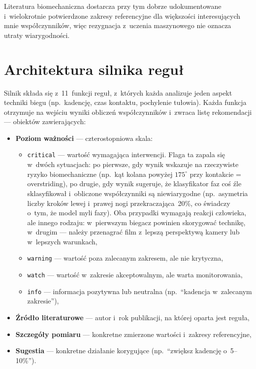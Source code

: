 Literatura biomechaniczna dostarcza przy tym dobrze udokumentowane i~wielokrotnie potwierdzone zakresy referencyjne dla większości interesujących mnie współczynników, więc rezygnacja z~uczenia maszynowego nie oznacza utraty wiarygodności.

\section{Architektura silnika reguł}
\label{sec:rules-arch}

Silnik składa się z~11~funkcji reguł, z~których każda analizuje jeden aspekt techniki biegu (np.~kadencję, czas kontaktu, pochylenie tułowia). Każda funkcja otrzymuje na wejściu wyniki obliczeń współczynników i~zwraca listę rekomendacji --- obiektów zawierających:

\begin{itemize}
    \item \textbf{Poziom ważności} --- czterostopniowa skala:
    \begin{itemize}
        \item \texttt{critical} --- wartość wymagająca interwencji. Flaga ta zapala się w~dwóch sytuacjach: po pierwsze, gdy wynik wskazuje na rzeczywiste ryzyko biomechaniczne (np.~kąt kolana powyżej $175^\circ$ przy kontakcie = overstriding), po drugie, gdy wynik sugeruje, że klasyfikator faz coś źle sklasyfikował i~obliczone współczynniki są niewiarygodne (np.~asymetria liczby kroków lewej i~prawej nogi przekraczająca~20\%, co świadczy o~tym, że model myli fazy). Oba przypadki wymagają reakcji człowieka, ale innego rodzaju: w~pierwszym biegacz powinien skorygować technikę, w~drugim --- należy przenagrać film z~lepszą perspektywą kamery lub w~lepszych warunkach,
        \item \texttt{warning} --- wartość poza zalecanym zakresem, ale nie krytyczna,
        \item \texttt{watch} --- wartość w~zakresie akceptowalnym, ale warta monitorowania,
        \item \texttt{info} --- informacja pozytywna lub neutralna (np.~``kadencja w~zalecanym zakresie''),
    \end{itemize}
    \item \textbf{Źródło literaturowe}  --- autor i~rok publikacji, na której oparta jest reguła,
    \item \textbf{Szczegóły pomiaru} --- konkretne zmierzone wartości i~zakresy referencyjne,
    \item \textbf{Sugestia} --- konkretne działanie korygujące (np.~``zwiększ kadencję o~5--10\%'').
\end{itemize}

